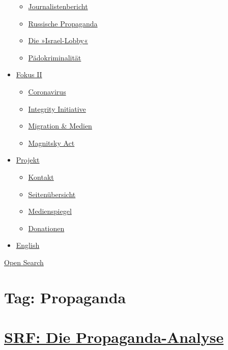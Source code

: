 \begin{itemize}
  \begin{itemize}
  \tightlist
  \item
    \href{https://swprs.org/bericht-eines-journalisten/}{Journalistenbericht}
  \item
    \href{https://swprs.org/russische-propaganda/}{Russische Propaganda}
  \item
    \href{https://swprs.org/die-israel-lobby-fakten-und-mythen/}{Die
    »Israel-Lobby«}
  \item
    \href{https://swprs.org/geopolitik-und-paedokriminalitaet/}{Pädokriminalität}
  \end{itemize}
\item
  \href{https://swprs.org/migration-und-medien/}{Fokus II}

  \begin{itemize}
  \tightlist
  \item
    \href{https://swprs.org/covid-19-hinweis-ii/}{Coronavirus}
  \item
    \href{https://swprs.org/die-integrity-initiative/}{Integrity
    Initiative}
  \item
    \href{https://swprs.org/migration-und-medien/}{Migration \& Medien}
  \item
    \href{https://swprs.org/der-fall-magnitsky/}{Magnitsky Act}
  \end{itemize}
\item
  \href{https://swprs.org/kontakt/}{Projekt}

  \begin{itemize}
  \tightlist
  \item
    \href{https://swprs.org/kontakt/}{Kontakt}
  \item
    \href{https://swprs.org/uebersicht/}{Seitenübersicht}
  \item
    \href{https://swprs.org/medienspiegel/}{Medienspiegel}
  \item
    \href{https://swprs.org/donationen/}{Donationen}
  \end{itemize}
\item
  \href{https://swprs.org/contact/}{English}
\end{itemize}

\protect\hyperlink{}{Open Search}

\hypertarget{tag-propaganda}{%
\section{Tag: Propaganda}\label{tag-propaganda}}

\hypertarget{srf-die-propaganda-analyse}{%
\section{\texorpdfstring{\href{https://swprs.org/2017/03/01/srf-propaganda-analyse/}{SRF:
Die
Propaganda-Analyse}}{SRF: Die Propaganda-Analyse}}\label{srf-die-propaganda-analyse}}

